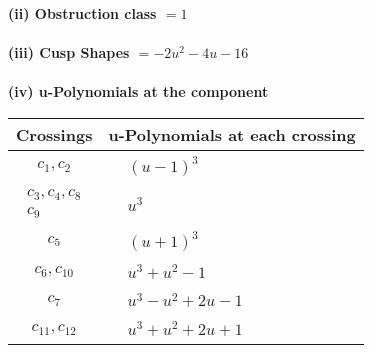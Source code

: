 \documentclass[1p]{elsarticle_modified}
\theoremstyle{definition}
\begin{document}
\flushleft \textbf{(ii) Obstruction class $= 1$}\\~\\
\flushleft \textbf{(iii) Cusp Shapes $= -2 u^2-4 u-16$}\\~\\
\newpage\renewcommand{\arraystretch}{1}
\flushleft \textbf{(iv) u-Polynomials at the component}\newline \\
\begin{tabular}{m{50pt}|m{274pt}}
Crossings & \hspace{64pt}u-Polynomials at each crossing \\
\hline $$\begin{aligned}c_{1},c_{2}\end{aligned}$$&$\begin{aligned}
&(u-1)^3
\end{aligned}$\\
\hline $$\begin{aligned}c_{3},c_{4},c_{8}\\c_{9}\end{aligned}$$&$\begin{aligned}
&u^3
\end{aligned}$\\
\hline $$\begin{aligned}c_{5}\end{aligned}$$&$\begin{aligned}
&(u+1)^3
\end{aligned}$\\
\hline $$\begin{aligned}c_{6},c_{10}\end{aligned}$$&$\begin{aligned}
&u^3+u^2-1
\end{aligned}$\\
\hline $$\begin{aligned}c_{7}\end{aligned}$$&$\begin{aligned}
&u^3- u^2+2 u-1
\end{aligned}$\\
\hline $$\begin{aligned}c_{11},c_{12}\end{aligned}$$&$\begin{aligned}
&u^3+u^2+2 u+1
\end{aligned}$\\
\hline
\end{tabular}\\~\\
\end{document}
